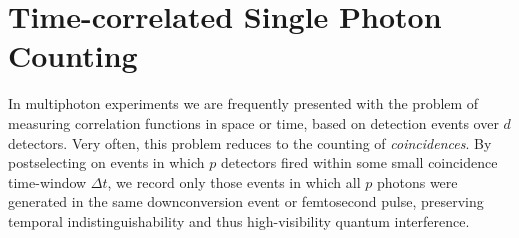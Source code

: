 \section{Time-correlated Single Photon Counting} 
\label{sec:counting}
In multiphoton experiments we are frequently presented with the problem of measuring correlation functions in space or time, based on detection events over $d$ detectors. Very often, this problem reduces to the counting of \emph{coincidences}. By postselecting on events in which $p$ detectors fired within some small coincidence time-window $\Delta t$, we record only those events in which all $p$ photons were generated in the same downconversion event or femtosecond pulse, preserving temporal indistinguishability and thus high-visibility quantum interference. 


